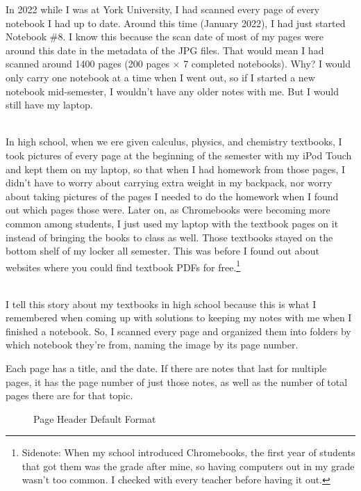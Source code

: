 \documentclass{article}
\begin{document}
In 2022 while I was at York University, I had scanned every page of every
notebook I had up to date. Around this time (January 2022), I had just started
Notebook \#8. I know this because the scan
date of most of my pages were around this date in the metadata of the JPG
files. That would mean I had scanned around 1400 pages (200 pages $\times$ 7
completed notebooks). Why? I would only carry one notebook at a time when I
went out, so if I started a new notebook mid-semester, I wouldn't have any
older notes with me. But I would still have my laptop.

\noindent {} \\
In high school, when we ere given calculus, physics, and chemistry textbooks, I
took pictures of every page at the beginning of the semester with my iPod  Touch and
kept them on my laptop, so that when I had homework from those pages, I didn't
have to worry about carrying extra weight in my backpack, nor worry about
taking pictures of the pages I needed to do the homework when I found out which
pages those were. Later on, as Chromebooks were becoming more common among
students, I just used my laptop with the textbook pages on it instead of
bringing the books to class as well. Those textbooks stayed on the bottom shelf
of my locker all semester. This was before I found out about websites where you
could find textbook PDFs for free.\footnote{Sidenote: When my school introduced Chromebooks, the first year of students that got them was the grade after mine, so having computers out in my grade wasn't too common. I checked with every teacher before having it out.}

\noindent {} \\
I tell this story about my textbooks in high school because this is what I
remembered when coming up with solutions to keeping my notes with me when I
finished a notebook. So, I scanned every page and organized them into folders
by which notebook they're from, naming the image by its page number.

Each page has a title, and the date. If there are notes that last for multiple pages, it has the page number of just those notes, as well as the number of total pages there are for that topic.

\begin{figure}[h!]
	\caption{Page Header Default Format}
	\centering
\end{figure}
\end{document}

